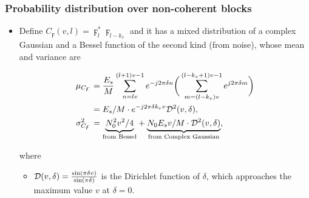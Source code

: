 \begin{frame}
  \frametitle{Probability distribution over non-coherent blocks}

    \begin{itemize}
    
      \item Define $C_{\digamma}(v,l)=\digamma_l^*\digamma_{l-k_v}$ and it has a mixed distribution of a complex Gaussian and 
      a Bessel function of the second kind (from noise), whose mean and variance are

      \begin{equation}
        \begin{aligned}
        \label{eq:mean_var_product_coherent_int}
        \mu_{C_{\digamma}}&=\frac{E_s}{M}\sum_{n=lv}^{(l+1)v-1}e^{-j2\pi \delta n}\bigg(\sum_{m=(l-k_v)v}^{(l-k_v+1)v-1}e^{j2\pi \delta m}\bigg) \\
        &=E_s/M\cdot e^{-j2\pi \delta k_vv}\mathcal{D}^2(v,\delta), \\
        \sigma^2_{C_{\digamma}}&={\underbrace{N_0^2v^2/4}_{\text{from Bessel}}}+{\underbrace{N_0E_sv/M\cdot\mathcal{D}^2(v,\delta)}_{\text{from Complex Gaussian}}},
        \end{aligned}
      \end{equation}

      where 
      \begin{itemize}
        \item $\mathcal{D}(v,\delta) = \frac{\sin(\pi \delta v)}{\sin(\pi
        \delta)}$ is the Dirichlet function of $\delta$, which approaches 
        the maximum value $v$ at $\delta=0$.
      \end{itemize}


    \end{itemize}



\end{frame}


